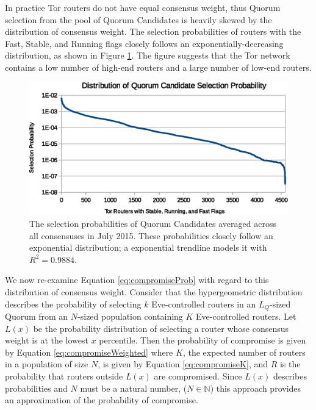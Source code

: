 \documentclass[USenglish,oneside,twocolumn]{article}
\begin{document}
In practice Tor routers do not have equal consensus weight, thus Quorum selection from the pool of Quorum Candidates is heavily skewed by the distribution of consensus weight. The selection probabilities of routers with the Fast, Stable, and Running flags closely follows an exponentially-decreasing distribution, as shown in Figure \ref{fig:weightDist}. The figure suggests that the Tor network contains a low number of high-end routers and a large number of low-end routers.

\begin{figure}[htbp]
	\centering
	\includegraphics[width=\linewidth]{../assets/analysis/QuorumCandidateWeights.eps}
	\caption{The selection probabilities of Quorum Candidates averaged across all consensuses in July 2015. These probabilities closely follow an exponential distribution; a exponential trendline models it with $ R^{2} = 0.9884 $.}
	\label{fig:weightDist}
\end{figure}

We now re-examine Equation \ref{eq:compromiseProb} with regard to this distribution of consensus weight. Consider that the hypergeometric distribution describes the probability of selecting $ k $ Eve-controlled routers in an $ L_{Q} $-sized Quorum from an $ N $-sized population containing $ K $ Eve-controlled routers. Let $ L(x) $ be the probability distribution of selecting a router whose consensus weight is at the lowest $ x $ percentile. Then the probability of compromise is given by Equation \ref{eq:compromiseWeighted} where $ K $, the expected number of routers in a population of size $ N $, is given by Equation \ref{eq:compromiseK}, and $ R $ is the probability that routers outside $ L(x) $ are compromised. Since $ L(x) $ describes probabilities and $ N $ must be a natural number, ($ N \in \mathbb{N} $) this approach provides an approximation of the probability of compromise.
\end{document}
